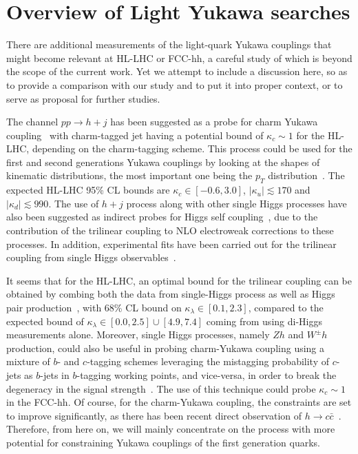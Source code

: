 \section{Overview of Light Yukawa searches \label{sec:comparetoothers}}
There are additional measurements of the light-quark Yukawa couplings that might become relevant at HL-LHC or FCC-hh, a careful study of which is beyond the scope of the current work. Yet we attempt to include a discussion here, so as to provide a comparison with our study and to put it into proper context, or to serve as proposal for further studies.

The channel $pp \to h +j $ has been suggested as a probe for charm Yukawa coupling~\cite{Brivio:2015fxa} with charm-tagged jet having a potential bound of $\kappa_c\sim 1$ for the HL-LHC, depending on the charm-tagging scheme. This process could be used for the first and second generations Yukawa couplings by looking at the shapes of kinematic distributions, the most important one being the $p_T$ distribution~\cite{Soreq:2016rae,Bishara:2016jga, Bonner:2016sdg}. The expected HL-LHC 95\% CL bounds are $\kappa_c \in [-0.6,3.0]$, $|\kappa_u |\lesssim 170 $ and $|\kappa_d| \lesssim 990$. The use of $h+j$ process along with other single Higgs processes have also been suggested as indirect probes for Higgs self coupling~\cite{McCullough:2013rea,Gorbahn:2016uoy,Bizon:2016wgr,Degrassi:2016wml,Maltoni:2017ims,Degrassi:2021uik}, due to the contribution of the trilinear coupling to NLO electroweak corrections to these processes. In addition, experimental fits have been carried out for the trilinear coupling from single Higgs observables~\cite{CMS:2018rig,ATLAS:2019pbo}. 

It seems that for the HL-LHC, an optimal bound for the trilinear coupling can be obtained by combing both the data from single-Higgs process as well as Higgs pair production~\cite{DiVita:2017eyz}, with 68\% CL bound on $\kappa_\lambda \in[0.1,2.3]$, compared to the expected bound of $\kappa_\lambda \in [0.0,2.5] \cup [4.9,7.4]$ coming from using di-Higgs measurements alone. Moreover, single Higgs processes, namely $Zh$ and $ W^\pm h$ production, could also be useful in probing charm-Yukawa coupling using a mixture of $b$- and $c$-tagging schemes leveraging the mistagging probability of $c$-jets as $b$-jets in $b$-tagging working points, and vice-versa, in order to break the degeneracy in the signal strength~\cite{Perez:2015lra}. The use of this technique could probe $\kappa_c \sim 1$ in the FCC-hh. Of course, for the charm-Yukawa coupling, the constraints are set to improve significantly, as there has been recent direct observation of $h\to c \bar c$~\cite{ATLAS-CONF-2021-021}. Therefore, from here on, we will mainly concentrate  on the process with more potential for constraining Yukawa couplings of the first generation quarks. 

